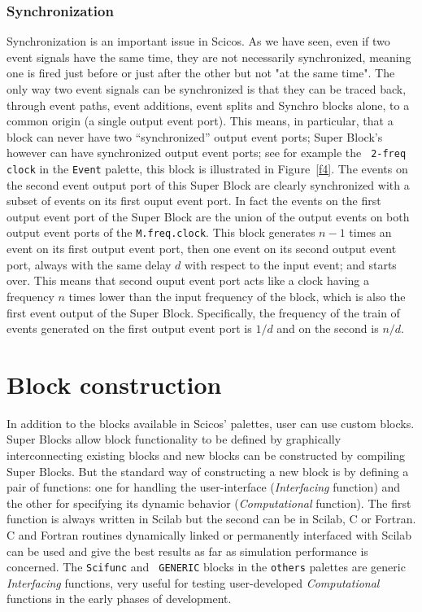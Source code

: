\documentclass{book}
\newcommand{\logical}{{Synchro }}
\newcommand{\computational}{{\em Computational }}
\newcommand{\interfacing}{{\em Interfacing }}
\begin{document}
\subsection{Synchronization}
Synchronization is an important issue in Scicos. As we have seen,
even if two event signals have the same time, they are not necessarily
synchronized, meaning one is fired just before or just after the
other but not "at the same time". The only way two event signals can be synchronized
is that they can be traced back, through event paths, event additions,
event splits and \logical blocks alone, to a common origin (a single
output event port). 
This means, in particular, that a block can never have two
``synchronized'' output event ports; Super Block's however can have
synchronized output event ports; see for example the {\tt
2-freq clock} in the  {\tt Event} palette, this block is illustrated in
Figure~\ref{f4}. The events on the second event output port of this 
Super Block are clearly synchronized with a subset of
events on its first ouput event port. In fact the events on the first
output event port of the Super Block are the union of the output events
on both output event ports of the {\tt M.freq.clock}. This block
generates $n-1$ times an event on its first output event port, then
one event on its second output event port, always with the same delay $d$
with respect to the input event; and starts over. This means
that second ouput event port acts like a clock having a frequency $n$
times lower than the input frequency of the block, which is also the first
event output of the Super Block. Specifically, the frequency of the train
of events generated on the first output event port is $1/d$ and on the
second is $n/d$. 



\chapter{Block construction}
\label{ch5}
In addition to the blocks available in Scicos' palettes, user can use
custom blocks. Super
Blocks  allow block functionality to be defined by graphically 
interconnecting existing blocks and new blocks can be constructed
by compiling Super Blocks. But the standard way of constructing a new block is
by defining a pair of functions: one for handling the user-interface 
(\interfacing function) and the other for specifying its dynamic behavior
(\computational function). The first function is always
written in Scilab but the second can be in 
Scilab, C or Fortran. C and Fortran routines dynamically linked or
permanently interfaced with Scilab can be used and give the best results as far as 
simulation performance is concerned.  The {\tt Scifunc} and {\tt
GENERIC} blocks in the  {\tt others} palettes are generic \interfacing
functions, very useful for testing user-developed \computational
functions in the early phases of development.
\end{document}
